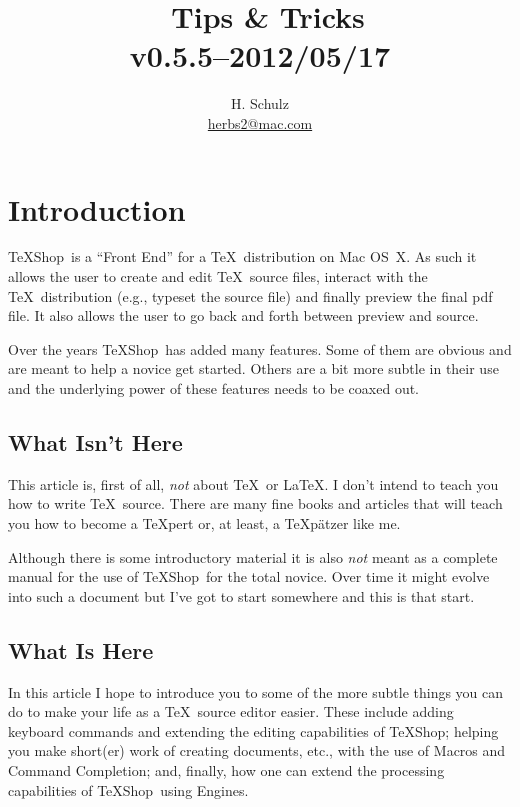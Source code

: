 \documentclass[letterpaper,11pt]{article}
\title{\TS\ Tips \& Tricks\\\small v0.5.5--2012/05/17}
\author{H. Schulz\\\small\href{mailto:herbs2@mac.com}{herbs2@mac.com}}
\date{}
\newcommand{\TS}{\textsf{\TeX Shop}}
\newcommand{\acr}[1]{\textsf{#1}}
\begin{document}
\maketitle

\tableofcontents

\newpage

\section{Introduction}

\TS\ is a ``Front End'' for a \TeX\ distribution on Mac OS~X. As such it allows the user to create and edit \TeX\ source files, interact with the \TeX\ distribution (e.g., typeset the source file) and finally preview the final \acr{pdf} file. It also allows the user to go back and forth between preview and source.

Over the years \TS\ has added many features. Some of them are obvious and are meant to help a novice get started. Others are a bit more subtle in their use and the underlying power of these features needs to be coaxed out.

\subsection{What Isn't Here}

This article is, first of all, \emph{not} about \TeX\ or \LaTeX. I don't intend to teach you how to write \TeX\ source. There are many fine books and articles that will teach you how to become a \TeX pert or, at least, a \TeX pätzer like me.

Although there is some introductory material it is also \emph{not} meant as a complete manual for the use of \TS\ for the total novice. Over time it might evolve into such a document but I've got to start somewhere and this is that start.

\subsection{What Is Here}

In this article I hope to introduce you to some of the more subtle things you can do to make your life as a \TeX\ source editor easier. These include adding keyboard commands and extending the editing capabilities of \TS; helping you make short(er) work of creating documents, etc., with the use of Macros and Command Completion; and, finally, how one can extend the processing capabilities of \TS\ using Engines.
\end{document}
